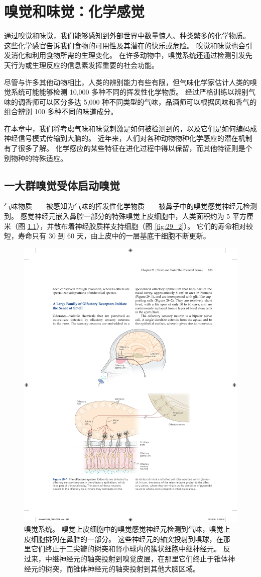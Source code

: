 \chapter{嗅觉和味觉：化学感觉} \label{chap:chap29}
通过嗅觉和味觉，我们能够感知到外部世界中数量惊人、种类繁多的化学物质。
这些化学感官告诉我们食物的可用性及其潜在的快乐或危险。
嗅觉和味觉也会引发消化和利用食物所需的生理变化。 
在许多动物中，嗅觉系统还通过检测引发先天行为或生理反应的信息素发挥重要的社会功能。


尽管与许多其他动物相比，人类的辨别能力有些有限，但气味化学家估计人类的嗅觉系统可能能够检测 10,000 多种不同的挥发性化学物质。
经过严格训练以辨别气味的调香师可以区分多达 5,000 种不同类型的气味，品酒师可以根据风味和香气的组合辨别 100 多种不同的味道成分。


在本章中，我们将考虑气味和味觉刺激是如何被检测到的，以及它们是如何编码成神经信号模式传输到大脑的。 
近年来，人们对各种动物物种化学感应的潜在机制有了很多了解。 
化学感应的某些特征在进化过程中得以保留，而其他特征则是个别物种的特殊适应。


\section{一大群嗅觉受体启动嗅觉}
气味物质——被感知为气味的挥发性化学物质——被鼻子中的嗅觉感觉神经元检测到。 
感觉神经元嵌入鼻腔一部分的特殊嗅觉上皮细胞中，人类面积约为 5 平方厘米（图 \ref{fig:29_1}），并散布着神经胶质样支持细胞（图 \ref{fig:29_2}）。
它们的寿命相对较短，寿命只有 30 到 60 天，由上皮中的一层基底干细胞不断更新。


\begin{figure}[htbp]
	\centering
	\includegraphics[width=0.7\linewidth]{chap29/fig_29_1}
	\caption{嗅觉系统。 嗅觉上皮细胞中的嗅觉感觉神经元检测到气味，嗅觉上皮细胞排列在鼻腔的一部分。 这些神经元的轴突投射到嗅球，在那里它们终止于二尖瓣的树突和肾小球内的簇状细胞中继神经元。 反过来，中继神经元的轴突投射到嗅觉皮层，在那里它们终止于锥体神经元的树突，而锥体神经元的轴突投射到其他大脑区域。}
	\label{fig:29_1}
\end{figure}


